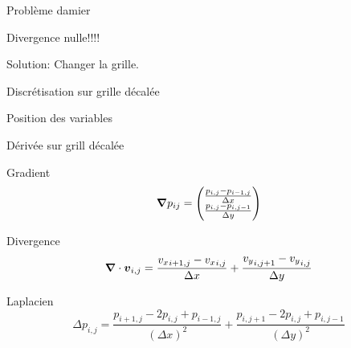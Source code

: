 \begin{frame}{Problème damier}
\begin{alertblock}{Divergence nulle!!!!}
\end{alertblock}

\begin{block}{Solution:}
 Changer la grille.
\end{block}


 
\end{frame}

\begin{frame}{Discrétisation sur grille décalée}
\begin{block}{Position des variables}
\shorthandoff{;:} 
 \shorthandon{:;}
\end{block}

 
\end{frame}

\begin{frame}{Dérivée sur grill décalée}
\begin{block}{Gradient}
 \begin{equation*}
  {\boldsymbol {\nabla}}p_{ij}=\begin{pmatrix}
    \frac{p_{i,j}-p_{i-1,j}}{\Delta x}\\
    \frac{p_{i,j}-p_{i,j-1}}{\Delta y}\\
                      \end{pmatrix}
 \end{equation*}
\end{block}

\begin{block}{Divergence}
 \begin{equation*}
{\boldsymbol {\nabla}}\cdot {\boldsymbol {v}}_{i,j}=\frac{{v_{x}}_{i+1,j}-{v_{x}}_{i,j}}{\Delta x}+\frac{{v_{y}}_{i,j+1}-{v_{y}}_{i,j}}{\Delta y}
 \end{equation*}
\end{block}
 
 \begin{block}{Laplacien}
 \begin{equation*}
    \Delta p_{i,j}=\frac{p_{i+1,j}-2p_{i,j}+p_{i-1,j}}{(\Delta x)^2}+\frac{p_{i,j+1}-2p_{i,j}+p_{i,j-1}}{(\Delta y)^2}
   \end{equation*}
 \end{block}

 
\end{frame}

